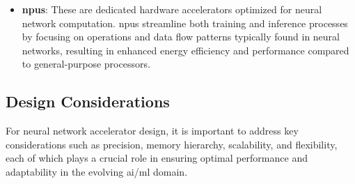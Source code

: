 \begin{itemize}
\begin{enumerate}
		\item \textbf{Prototyping and Evolution}: Given their reconfigurable nature, \glspl{fpga} are excellent platforms for prototyping neural network architectures. Furthermore, in environments where neural network models evolve or are frequently updated, \glspl{fpga} can adapt without requiring new hardware, even during an ongoing operation.
		
		\item \textbf{Trade-offs}: While \glspl{fpga} offer flexibility, they might not achieve the same level of performance or energy efficiency as a highly-optimized \gls{asic} for a specific task. However, their adaptability can outweigh this in certain scenarios.
	\end{enumerate}
	
	In the context of the rapidly evolving field of \gls{ai}/\gls{ml}, \glspl{fpga} provide a compelling balance of adaptability and performance, especially when agility in hardware is desired.
	
	\item \textbf{\glspl{npu}}: These are dedicated hardware accelerators optimized for neural network computation. \glspl{npu} streamline both training and inference processes by focusing on operations and data flow patterns typically found in neural networks, resulting in enhanced energy efficiency and performance compared to general-purpose processors.
	
\end{itemize}

\subsection{Design Considerations}
For neural network accelerator design, it is important to address key considerations such as precision, memory hierarchy, scalability, and flexibility, each of which plays a crucial role in ensuring optimal performance and adaptability in the evolving \gls{ai}/\gls{ml} domain.

